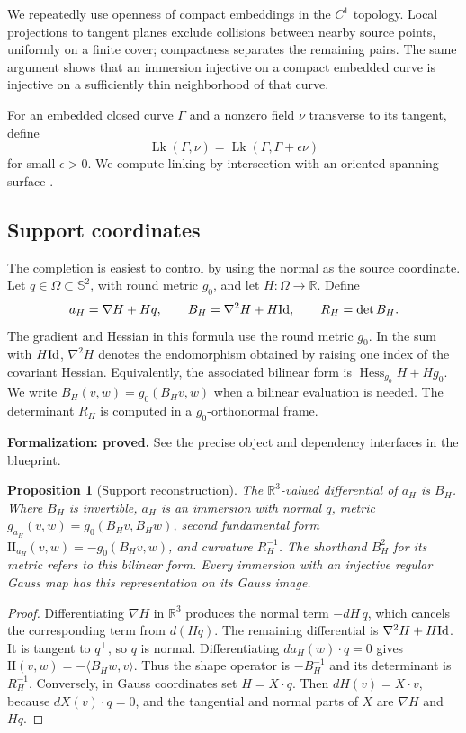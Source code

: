 \documentclass[11pt]{amsart}
\newtheorem{proposition}[theorem]{Proposition}
\theoremstyle{definition}
\theoremstyle{remark}
\newcommand{\R}{\mathbb R}\newcommand{\Sph}{\mathbb S}
\DeclareMathOperator{\Lk}{Lk}
\newcommand{\II}{\mathrm{II}}\newcommand{\Gmap}{\mathcal G}
\numberwithin{equation}{section}
\begin{document}
We repeatedly use openness of compact embeddings in the $C^1$ topology.
Local projections to tangent planes exclude collisions between nearby
source points, uniformly on a finite cover; compactness separates the
remaining pairs. The same argument shows that an immersion injective on
a compact embedded curve is injective on a sufficiently thin neighborhood
of that curve.

For an embedded closed curve $\Gamma$ and a nonzero field $\nu$ transverse
to its tangent, define
\[
 \Lk(\Gamma,\nu)=\Lk(\Gamma,\Gamma+\epsilon\nu)
\]
for small $\epsilon>0$. We compute linking by intersection with an
oriented spanning surface \cite{Rolfsen}.

\subsection{Support coordinates}\label{sec:support}
The completion is easiest to control by using the normal as the source
coordinate. Let $q\in\Omega\subset\Sph^2$, with round metric $g_0$, and
let $H:\Omega\to\R$. Define
\begin{equation}\label{eq:support}
 a_H=\nabla H+Hq,\qquad B_H=\nabla^2H+H\mathrm{Id},
 \qquad R_H=\det B_H.
\end{equation}
The gradient and Hessian in this formula use the round metric $g_0$.
In the sum with $H\mathrm{Id}$, $\nabla^2H$ denotes the endomorphism obtained
by raising one index of the covariant Hessian. Equivalently, the
associated bilinear form is $\operatorname{Hess}_{g_0}H+Hg_0$.
We write $B_H(v,w)=g_0(B_Hv,w)$ when a bilinear evaluation is needed.
The determinant $R_H$ is computed in a $g_0$-orthonormal frame.

\par\noindent\textbf{Formalization: proved.} See the precise object and dependency interfaces in the blueprint.\par
\begin{proposition}[Support reconstruction]\label{prop:support}
The $\R^3$-valued differential of $a_H$ is $B_H$. Where $B_H$ is
invertible, $a_H$ is an immersion with normal $q$, metric
$g_{a_H}(v,w)=g_0(B_Hv,B_Hw)$, second fundamental form
$\II_{a_H}(v,w)=-g_0(B_Hv,w)$, and curvature $R_H^{-1}$.
The shorthand $B_H^2$ for its metric refers to this bilinear form. Every immersion
with an injective regular Gauss map has this representation on its Gauss
image.
\end{proposition}
\begin{proof}
Differentiating $\nabla H$ in $\R^3$ produces the normal term
$-dH\,q$, which cancels the corresponding term from $d(Hq)$.
The remaining differential is $\nabla^2H+H\mathrm{Id}$. It is tangent to
$q^\perp$, so $q$ is normal. Differentiating $da_H(w)\cdot q=0$ gives
$\II(v,w)=-\langle B_Hw,v\rangle$. Thus the shape operator is
$-B_H^{-1}$ and its determinant is $R_H^{-1}$.
Conversely, in Gauss coordinates set $H=X\cdot q$. Then
$dH(v)=X\cdot v$, because $dX(v)\cdot q=0$, and the tangential and normal
parts of $X$ are $\nabla H$ and $Hq$.
\end{proof}
\end{document}
